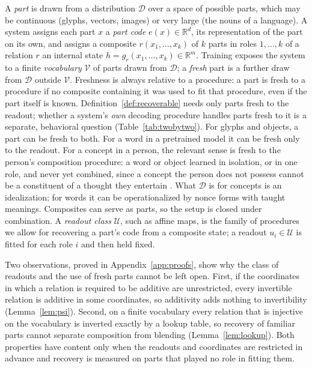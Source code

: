 \documentclass[10pt]{article}
\theoremstyle{plain}
\theoremstyle{remark}
\newcommand{\R}{\mathbb{R}}
\newcommand{\U}{\mathcal{U}}
\newcommand{\D}{\mathcal{D}}
\newcommand{\Voc}{\mathcal{V}}
\begin{document}
A \emph{part} is drawn from a distribution $\D$ over a space of possible parts, which may be continuous (glyphs, vectors, images) or very large (the nouns of a language). A system assigns each part $x$ a \emph{part code} $e(x) \in \R^d$, its representation of the part on its own, and assigns a composite $r(x_1, \ldots, x_k)$ of $k$ parts in roles $1, \ldots, k$ of a relation $r$ an internal state $h = g_r(x_1, \ldots, x_k) \in \R^m$. Training exposes the system to a finite \emph{vocabulary} $\Voc$ of parts drawn from $\D$; a \emph{fresh} part is a further draw from $\D$ outside $\Voc$. Freshness is always relative to a procedure: a part is fresh to a procedure if no composite containing it was used to fit that procedure, even if the part itself is known. Definition~\ref{def:recoverable} needs only parts fresh to the readout; whether a system's \emph{own} decoding procedure handles parts fresh to it is a separate, behavioral question (Table~\ref{tab:twobytwo}). For glyphs and objects, a part can be fresh to both. For a word in a pretrained model it can be fresh only to the readout. For a concept in a person, the relevant sense is fresh to the person's composition procedure: a word or object learned in isolation, or in one role, and never yet combined, since a concept the person does not possess cannot be a constituent of a thought they entertain \citep{fodor2002}. What $\D$ is for concepts is an idealization; for words it can be operationalized by nonce forms with taught meanings. Composites can serve as parts, so the setup is closed under combination. A \emph{readout class} $\U$, such as affine maps, is the family of procedures we allow for recovering a part's code from a composite state; a readout $u_i \in \U$ is fitted for each role $i$ and then held fixed.

Two observations, proved in Appendix~\ref{app:proofs}, show why the class of readouts and the use of fresh parts cannot be left open. First, if the coordinates in which a relation is required to be additive are unrestricted, every invertible relation is additive in some coordinates, so additivity adds nothing to invertibility (Lemma~\ref{lem:psi}). Second, on a finite vocabulary every relation that is injective on the vocabulary is inverted exactly by a lookup table, so recovery of familiar parts cannot separate composition from blending (Lemma~\ref{lem:lookup}). Both properties have content only when the readouts and coordinates are restricted in advance and recovery is measured on parts that played no role in fitting them.
\end{document}
